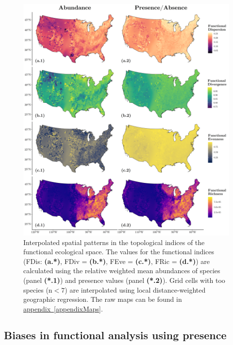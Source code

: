 \documentclass[
  10pt,
]{article}
\newcommand{\aref}[1]{\hyperref[#1]{appendix~\ref*{#1}}}
\begin{document}
\newpage

\begin{figure}
  \centering
  \includegraphics[width=\textwidth]{../Final Visualizations/interpolatedMap.png}
  \caption{Interpolated spatial patterns in the topological indices of the functional ecological space. The values for the functional indices (FDis: \textbf{(a.*)}, FDiv = \textbf{(b.*)}, FEve = \textbf{(c.*)}, FRic = \textbf{(d.*)}) are calculated using the relative weighted mean abundances of species (panel \textbf{(*.1)}) and presence values (panel \textbf{(*.2)}). Grid cells with too species (n$<7$) are interpolated using local distance-weighted geographic regression. The raw maps can be found in \aref{appendixMaps}.}
  \label{fig:interpolatedMaps}
\end{figure}

\FloatBarrier

\newpage

\hypertarget{ResultsBias}{%
\subsection{Biases in functional analysis using presence}\label{ResultsBias}}
\end{document}
